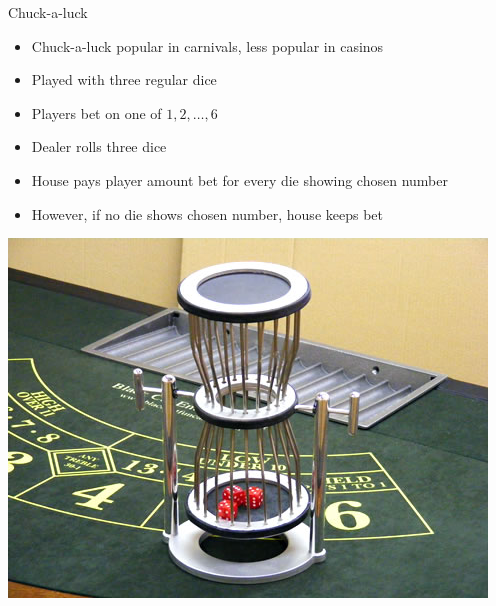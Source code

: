 \documentclass[handout]{beamer}
\theoremstyle{definition}
\begin{document}
\begin{frame}{Chuck-a-luck}
\begin{multicols}{2}
\begin{itemize}
\item Chuck-a-luck popular in carnivals, less
popular in casinos
\item Played with three regular dice
\item Players bet on one of $1,2,\ldots,6$
\item Dealer rolls three dice
\item House pays player amount bet for every
die showing chosen number
\item However, if no die shows chosen number,
house keeps bet
\end{itemize}
\includegraphics[scale=.35]{Chuck}
\end{multicols}
\end{frame}
\end{document}
